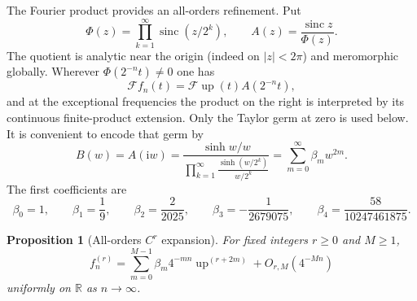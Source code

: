 \documentclass[11pt,oneside]{article}
\newtheorem{proposition}[theorem]{Proposition}
\theoremstyle{definition}
\theoremstyle{remark}
\newcommand{\R}{\mathbb R}
\newcommand{\Up}{\operatorname{up}}
\newcommand{\sinc}{\operatorname{sinc}}
\newcommand{\iu}{\mathrm i}
\begin{document}
The Fourier product provides an all-orders refinement.  Put
\begin{equation}
 \Phi(z)=\prod_{k=1}^{\infty}\sinc(z/2^k),
 \qquad
 A(z)=\frac{\sinc z}{\Phi(z)}.
 \label{eq:A-ratio}
\end{equation}
The quotient is analytic near the origin (indeed on $|z|<2\pi$) and meromorphic
globally.  Wherever $\Phi(2^{-n}t)\ne0$ one has
\begin{equation}
 \mathscr F f_n(t)=\mathscr F\Up(t)A(2^{-n}t),
 \label{eq:fourier-ratio}
\end{equation}
and at the exceptional frequencies the product on the right is interpreted by its
continuous finite-product extension.  Only the Taylor germ at zero is used below.  It is
convenient to encode that germ by
\begin{equation}
 B(w)=A(\iu w)
 =\frac{\sinh w/w}{\displaystyle\prod_{k=1}^{\infty}
 \frac{\sinh(w/2^k)}{w/2^k}}
 =\sum_{m=0}^{\infty}\beta_mw^{2m}.
 \label{eq:B-generating}
\end{equation}
The first coefficients are
\begin{equation}
 \beta_0=1,
 \qquad \beta_1=\frac19,
 \qquad \beta_2=\frac{2}{2025},
 \qquad \beta_3=-\frac1{2679075},
 \qquad \beta_4=\frac{58}{10247461875}.
 \label{eq:beta-first}
\end{equation}

\begin{proposition}[All-orders $C^r$ expansion]
\label{prop:all-orders-expansion}
For fixed integers $r\ge0$ and $M\ge1$,
\begin{equation}
 f_n^{(r)}
 =\sum_{m=0}^{M-1}\beta_m4^{-mn}\Up^{(r+2m)}
 +O_{r,M}(4^{-Mn})
 \label{eq:all-orders-expansion}
\end{equation}
uniformly on $\R$ as $n\to\infty$.
\end{proposition}
\end{document}
